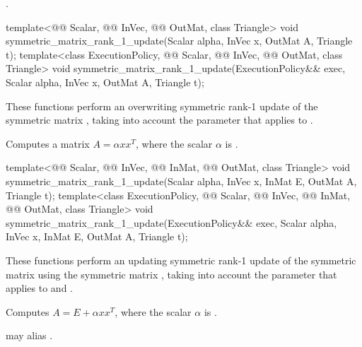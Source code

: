 \pnum
\complexity
{}.

%
\begin{itemdecl}
template<@@ Scalar, @@ InVec, @@ OutMat, class Triangle>
  void symmetric_matrix_rank_1_update(Scalar alpha, InVec x, OutMat A, Triangle t);
template<class ExecutionPolicy,
         @@ Scalar, @@ InVec, @@ OutMat, class Triangle>
  void symmetric_matrix_rank_1_update(ExecutionPolicy&& exec,
                                      Scalar alpha, InVec x, OutMat A, Triangle t);
\end{itemdecl}

\begin{itemdescr}
\pnum
These functions perform
an overwriting symmetric rank-1 update of the symmetric matrix ,
taking into account the  parameter
that applies to .

\pnum
\effects
Computes a matrix $A = \alpha x x^T$,
where the scalar $\alpha$ is .
\end{itemdescr}

%
\begin{itemdecl}
template<@@ Scalar, @@ InVec, @@ InMat, @@ OutMat,
         class Triangle>
  void symmetric_matrix_rank_1_update(Scalar alpha, InVec x, InMat E, OutMat A, Triangle t);
template<class ExecutionPolicy, @@ Scalar, @@ InVec, @@ InMat,
         @@ OutMat, class Triangle>
  void symmetric_matrix_rank_1_update(ExecutionPolicy&& exec,
                                      Scalar alpha, InVec x, InMat E, OutMat A, Triangle t);
\end{itemdecl}

\begin{itemdescr}
\pnum
These functions perform
an updating symmetric rank-1 update of the symmetric matrix 
using the symmetric matrix ,
taking into account the  parameter
that applies to  and .

\pnum
\effects
Computes $A = E + \alpha x x^T$,
where the scalar $\alpha$ is .

\pnum
\remarks
{} may alias .
\end{itemdescr}

